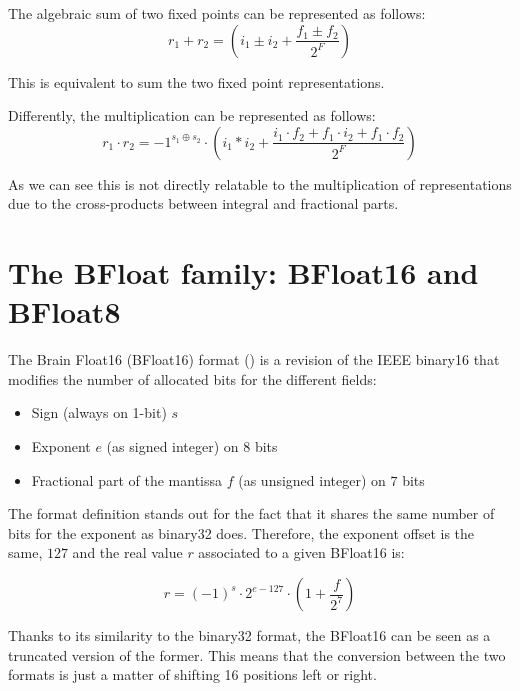 The algebraic sum of two fixed points can be represented as follows:
\begin{equation}\label{eqn:fixedSum}
    r_1 + r_2 = \left(i_1 \pm i_2 + \frac{f_1 \pm f_2}{2^{F}}\right)
\end{equation}

This is equivalent to sum the two fixed point representations.

Differently, the multiplication can be represented as follows:
\begin{equation}\label{eqn:fixedMul}
    r_1 \cdot r_2 = -1^{s_1 \oplus s_2}\cdot \left(i_1 * i_2 + \frac{i_1 \cdot f_2 + f_1\cdot i_2 + f_1 \cdot f_2}{2^F}\right) 
\end{equation}

As we can see this is not directly relatable to the multiplication of representations due to the cross-products between integral and fractional parts.

\section{The BFloat family: BFloat16 and BFloat8}

The Brain Float16 (BFloat16) format (\cite{burgess2019bfloat}) is a revision of the IEEE binary16 that modifies the number of allocated bits for the different fields:

\begin{itemize}
    \item Sign (always on 1-bit) $s$
    \item Exponent $e$ (as signed integer) on $8$ bits
    \item Fractional part of the mantissa $f$ (as unsigned integer) on $7$ bits
\end{itemize}

The format definition stands out for the fact that it shares the same number of bits for the exponent as binary32 does. Therefore, the exponent offset is the same, $127$ and the real value $r$ associated to a given BFloat16 is:

\begin{equation}\label{eqn:bfloat162real}
    r = (-1)^s \cdot 2^{e-127} \cdot \left(1 + \frac{f}{2^7} \right)
\end{equation}

Thanks to its similarity to the binary32 format, the BFloat16 can be seen as a truncated version of the former. This means that the conversion between the two formats is just a matter of shifting 16 positions left or right.

